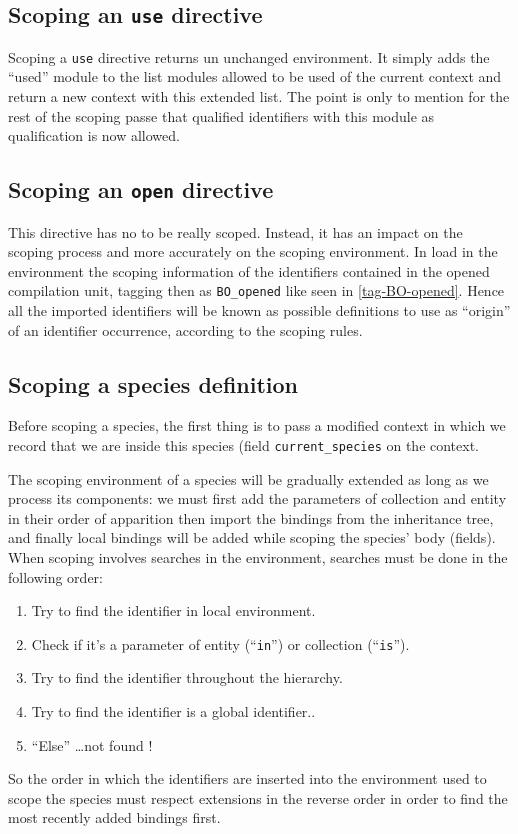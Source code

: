 \subsection{Scoping an {\tt use} directive}
Scoping a {\tt use} directive returns un unchanged environment.
It simply adds the ``used'' module to the list modules allowed to be
used of the current context and return a new context with this
extended list. The point is only to mention for the rest of the
scoping passe that qualified identifiers with this module as
qualification is now allowed.


\subsection{Scoping an {\tt open} directive}
This directive has no to be really scoped. Instead, it has an impact
on the scoping process and more accurately on the scoping environment.
In load in the environment the scoping information of the identifiers
contained in the opened compilation unit, tagging then as
{\tt BO\_opened} like seen in \ref{tag-BO-opened}. Hence all the
imported identifiers will be known as possible definitions to use as
``origin'' of an identifier occurrence, according to the scoping
rules.


\subsection{Scoping a species definition}
Before scoping a species, the first thing is to pass a modified
context in which we record that we are inside this species (field
{\tt current\_species} on the context.

The scoping environment of a species will be gradually extended as
long as we process its components: we must first add the parameters of
collection and entity in their order of apparition then import the
bindings from the inheritance tree, and finally local bindings will be
added while scoping the species' body (fields). When scoping involves
searches in the environment, searches must be done in the following
order:
\begin{enumerate}
\item Try to find the identifier in local environment.
\item Check if it's a parameter of entity (``{\tt in}'') or collection
  (``{\tt is}'').
\item Try to find the identifier throughout the hierarchy.
\item Try to find the identifier is a global identifier..
\item ``Else'' \ldots not found !
\end{enumerate}
So the order in which the identifiers are inserted into the
environment used to scope the species must respect extensions in the
reverse order in order to find the most recently added bindings first.

